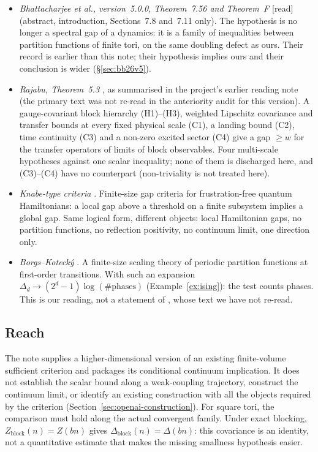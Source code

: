\documentclass[11pt,a4paper]{article}
\theoremstyle{plain}
\theoremstyle{definition}
\theoremstyle{remark}
\numberwithin{equation}{section}
\newcommand{\st}[1]{\textsf{[#1]}}
\begin{document}
\begin{itemize}
imply the other.
\item \emph{Bhattacharjee et al., version~5.0.0, Theorem~7.56 and Theorem~F \cite{BB26v5}} \st{read} (abstract, introduction, Sections~7.8
and~7.11 only). The hypothesis is no longer a spectral gap of a dynamics: it is a family of inequalities between partition functions of
finite tori, on the same doubling defect as ours. Their record is earlier than this note; their hypothesis implies ours and their conclusion
is wider (\S\ref{sec:bb26v5}).
\item \emph{Rajabu, Theorem~5.3 \cite{Raj26}}, as summarised in the project's earlier reading note (the primary text was not re-read in the anteriority audit for this version). A gauge-covariant block hierarchy (H1)--(H3), weighted Lipschitz covariance and
transfer bounds at every fixed physical scale (C1), a landing bound (C2), time continuity (C3) and a non-zero excited sector (C4) give a
gap $\ge w$ for the transfer operators of limits of block observables. Four multi-scale hypotheses against one scalar inequality; none of
them is discharged here, and (C3)--(C4) have no counterpart (non-triviality is not treated here).
\item \emph{Knabe-type criteria} \cite{Kna88,GM16,Lem19}. Finite-size gap criteria for frustration-free quantum Hamiltonians: a local
gap above a threshold on a finite subsystem implies a global gap. Same logical form, different objects: local Hamiltonian gaps, no
partition functions, no reflection positivity, no continuum limit, one direction only.
\item \emph{Borgs--Koteck\'y} \cite{BK90}. A finite-size scaling theory of periodic partition functions at first-order transitions. With
such an expansion $\Delta_d\to(2^d-1)\log(\#\text{phases})$ (Example~\ref{ex:ising}): the test counts phases. This is our reading, not
a statement of \cite{BK90}, whose text we have not re-read.
\end{itemize}

\subsection{Reach}
The note supplies a higher-dimensional version of an existing finite-volume sufficient criterion and packages its conditional continuum
implication. It does not establish the scalar bound along a weak-coupling trajectory, construct the continuum limit, or identify an existing
construction with all the objects required by the criterion (Section~\ref{sec:openai-construction}). For square tori, the comparison must hold along
the actual convergent family. Under exact blocking, $Z_{\mathrm{block}}(n)=Z(bn)$ gives $\Delta_{\mathrm{block}}(n)=\Delta(bn)$: this covariance is
an identity, not a quantitative estimate that makes the missing smallness hypothesis easier.
\end{document}
